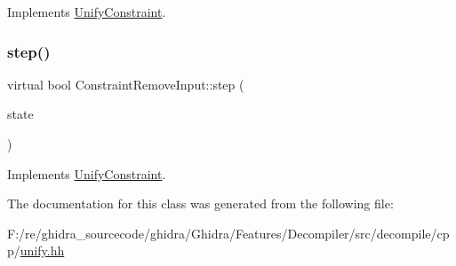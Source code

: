 Implements \mbox{\hyperlink{class_unify_constraint_a774f6a611a96384766cb8e8d8f5ff41f}{Unify\+Constraint}}.

\mbox{\label{class_constraint_remove_input_a8ca6138d7f67a2eb97ad988aeb57d54a}} 
\subsubsection{\texorpdfstring{step()}{step()}}
{\footnotesize\ttfamily virtual bool Constraint\+Remove\+Input\+::step (\begin{DoxyParamCaption}\item[{\mbox{\hyperlink{class_unify_state}{Unify\+State}} \&}]{state }\end{DoxyParamCaption})\hspace{0.3cm}{\ttfamily [virtual]}}



Implements \mbox{\hyperlink{class_unify_constraint_ad9ab4ad91037f96bf803735d414d212d}{Unify\+Constraint}}.



The documentation for this class was generated from the following file\+:\begin{DoxyCompactItemize}
\item 
F\+:/re/ghidra\+\_\+sourcecode/ghidra/\+Ghidra/\+Features/\+Decompiler/src/decompile/cpp/\mbox{\hyperlink{unify_8hh}{unify.\+hh}}\end{DoxyCompactItemize}
